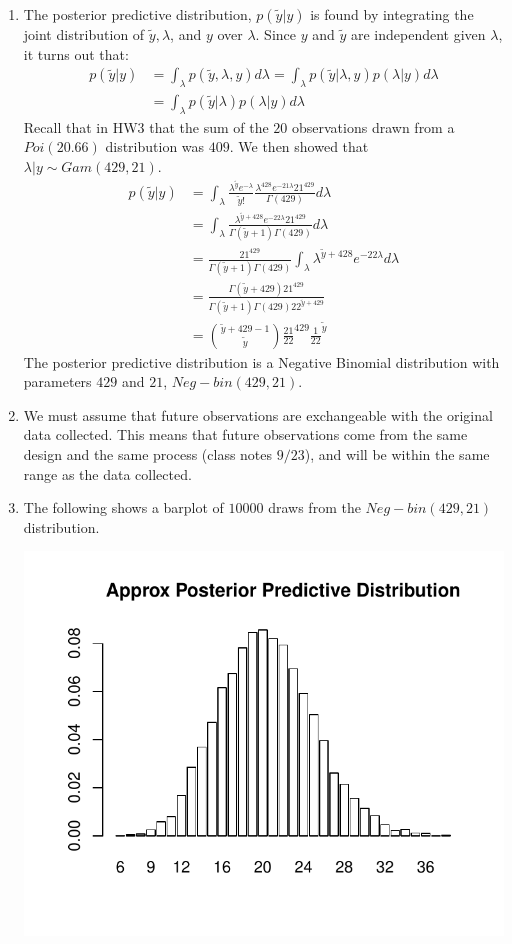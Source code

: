 \documentclass[12pt]{article}\usepackage[]{graphicx}\usepackage[]{color}
\newenvironment{knitrout}{}{} %
\newcommand{\ytil}{\mbox{$\tilde{y}$}}
\begin{document}
\begin{doublespacing}
\begin{enumerate}
\item The posterior predictive distribution, $p(\tilde{y}|y)$ is found by integrating the joint distribution of $\tilde{y}, \lambda$, and $y$ over $\lambda$. Since $y$ and $\ytil$ are independent given $\lambda$, it turns out that:
\begin{align*}
p(\tilde{y}|y) &= \int_{\lambda}p(\tilde{y}, \lambda, y) d\lambda = \int_{\lambda}p(\tilde{y}|\lambda, y)p(\lambda|y) d\lambda\\
&= \int_{\lambda}p(\ytil|\lambda)p(\lambda|y) d\lambda
\end{align*}
Recall that in HW3 that the sum of the $20$ observations drawn from a $Poi(20.66)$ distribution was $409$. We then showed that $\lambda|y \sim Gam(429, 21)$.
\begin{align*}
p(\tilde{y}|y) &= \int_{\lambda}\frac{\lambda^{\ytil}e^{-\lambda}}{\tilde{y}!}\frac{\lambda^{428}e^{-21\lambda}21^{429}}{\Gamma(429)} d\lambda \\
&= \int_{\lambda}\frac{\lambda^{\ytil+428}e^{-22\lambda}21^{429}}{\Gamma(\ytil+1)\Gamma(429)} d\lambda \\
&= \frac{21^{429}}{{\Gamma(\ytil+1)\Gamma(429)}}\int_{\lambda}\lambda^{\ytil+428}e^{-22\lambda} d\lambda \\
&= \frac{\Gamma(\ytil+429)21^{429}}{{\Gamma(\ytil+1)\Gamma(429)22^{\ytil+429}}} \\
&= {\ytil+429-1 \choose \ytil}\frac{21}{22}^{429}\frac{1}{22}^{\ytil}
\end{align*}
The posterior predictive distribution is a Negative Binomial distribution with parameters $429$ and $21$, $Neg-bin(429, 21)$.

\item We must assume that future observations are exchangeable with the original data collected. This means that future observations come from the same design and the same process (class notes $9/23$), and will be within the same range as the data collected.

\item The following shows a barplot of $10000$ draws from the $Neg-bin(429, 21)$ distribution.
\begin{center}
\begin{knitrout}\footnotesize
{}\color{fgcolor}
\includegraphics[width=.5\linewidth]{figure/postpreddraws-1} 


\end{knitrout}
\end{center}
\end{enumerate}
\end{doublespacing}
\end{document}
